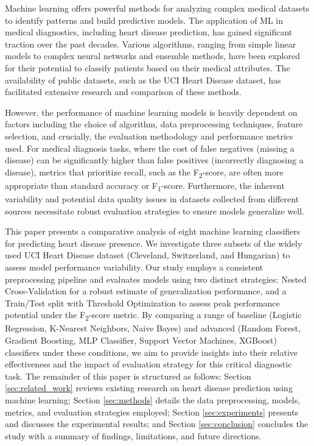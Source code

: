 \documentclass{article}
\begin{document}
Machine learning offers powerful methods for analyzing complex medical datasets to identify patterns and build predictive models. The application of ML in medical diagnostics, including heart disease prediction, has gained significant traction over the past decades. Various algorithms, ranging from simple linear models to complex neural networks and ensemble methods, have been explored for their potential to classify patients based on their medical attributes. The availability of public datasets, such as the UCI Heart Disease dataset, has facilitated extensive research and comparison of these methods.

However, the performance of machine learning models is heavily dependent on factors including the choice of algorithm, data preprocessing techniques, feature selection, and crucially, the evaluation methodology and performance metrics used. For medical diagnosis tasks, where the cost of false negatives (missing a disease) can be significantly higher than false positives (incorrectly diagnosing a disease), metrics that prioritize recall, such as the F\textsubscript{2}-score, are often more appropriate than standard accuracy or F\textsubscript{1}-score. Furthermore, the inherent variability and potential data quality issues in datasets collected from different sources necessitate robust evaluation strategies to ensure models generalize well.

This paper presents a comparative analysis of eight machine learning classifiers for predicting heart disease presence. We investigate three subsets of the widely used UCI Heart Disease dataset (Cleveland, Switzerland, and Hungarian) to assess model performance variability. Our study employs a consistent preprocessing pipeline and evaluates models using two distinct strategies: Nested Cross-Validation for a robust estimate of generalization performance, and a Train/Test split with Threshold Optimization to assess peak performance potential under the F\textsubscript{2}-score metric. By comparing a range of baseline (Logistic Regression, K-Nearest Neighbors, Naive Bayes) and advanced (Random Forest, Gradient Boosting, MLP Classifier, Support Vector Machines, XGBoost) classifiers under these conditions, we aim to provide insights into their relative effectiveness and the impact of evaluation strategy for this critical diagnostic task. The remainder of this paper is structured as follows: Section \ref{sec:related_work} reviews existing research on heart disease prediction using machine learning; Section \ref{sec:methods} details the data preprocessing, models, metrics, and evaluation strategies employed; Section \ref{sec:experiments} presents and discusses the experimental results; and Section \ref{sec:conclusion} concludes the study with a summary of findings, limitations, and future directions.
\end{document}
